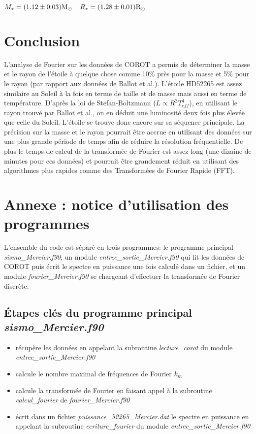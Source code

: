 \documentclass[a4paper,11pt]{article}
\numberwithin{equation}{section}
\begin{document}
\begin{center}
$M_{*} = (1.12 \pm 0.03) \rm M_{\odot}$\   \ $R_{*} =  (1.28\pm 0.01) \rm R_{\odot}$
\end{center}

\section{Conclusion}
L'analyse de Fourier sur les données de COROT a permis de déterminer la masse et le rayon de l'étoile à quelque chose comme 10\% près pour la masse et 5\% pour le rayon (par rapport aux données de Ballot et al.). L'étoile HD52265 est assez similaire au Soleil à la fois en terme de taille et de masse mais aussi en terme de température. D'après la loi de Stefan-Boltzmann ($L \propto R^2 T_{eff}^4$), en utilisant le rayon trouvé par Ballot et al., on en déduit une luminosité deux fois plus élevée que celle du Soleil. L'étoile se trouve donc encore sur sa séquence principale.\newline
La précision sur la masse et le rayon pourrait être accrue en utilisant des données sur une plus grande période de temps afin de réduire la résolution fréquentielle. De plus le temps de calcul de la transformée de Fourier est assez long (une dizaine de minutes pour ces données) et pourrait être grandement réduit en utilisant des algorithmes plus rapides comme des Transformées de Fourier Rapide (FFT). 

\newpage
\appendix
\section{Annexe : notice d'utilisation des programmes}
L'ensemble du code est séparé en trois programmes: le programme principal \textit{sismo\_Mercier.f90}, un module \textit{entree\_sortie\_Mercier.f90} qui lit les données de COROT puis écrit le spectre en puissance une fois calculé dans un fichier, et un module \textit{fourier\_Mercier.f90} se chargeant d'effectuer la transformée de Fourier discrète.\newline
\subsection{Étapes clés du programme principal \textit{sismo\_Mercier.f90}}

\begin{itemize}
  \item récupère les données en appelant la subroutine \textit{lecture\_corot} du module \textit{entree\_sortie\_Mercier.f90}
  \item calcule le nombre maximal de fréquences de Fourier $k_m$
  \item calcule la transformée de Fourier en faisant appel à la subroutine \textit{calcul\_fourier} de \textit{fourier\_Mercier.f90}
  \item écrit dans un fichier \textit{puissance\_52265\_Mercier.dat} le spectre en puissance en appelant la subroutine \textit{ecriture\_fourier} du module 
        \textit{entree\_sortie\_Mercier.f90}
\end{itemize}
\end{document}
